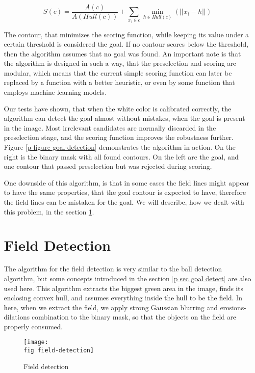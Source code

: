 \begin{equation*}
  S(c)=\frac{A(c)}{A(Hull(c))}+\displaystyle\sum_{x_i \in c}\min_{h \in Hull(c)
  }(||x_i-h||)
\end{equation*}

The contour, that minimizes the scoring function, while keeping its value under
a certain threshold is considered the goal. If no contour scores below the
threshold, then the algorithm assumes that no goal was found. An important note
is that the algorithm is designed in such a way, that the preselection and
scoring are modular, which means that the current simple scoring function can
later be replaced by a function with a better heuristic, or even by some
function that employs machine learning models.

Our tests have shown, that when the white color is calibrated correctly, the
algorithm can detect the goal almost without mistakes, when the goal is present
in the image. Most irrelevant candidates are normally discarded in the
preselection stage, and the scoring function improves the robustness further.
Figure \ref{p figure goal-detection} demonstrates the algorithm in action. On
the right is the binary mask with all found contours. On the left are the goal,
and one contour that passed preselection but was rejected during scoring.

One downside of this algorithm, is that in some cases the field lines
might appear to have the same properties, that the goal contour is expected to
have, therefore the field lines can be mistaken for the goal. We will describe,
how we dealt with this problem, in the section \ref{p sec field detect}.

\section{Field Detection}
\label{p sec field detect}

The algorithm for the field detection is very similar to the ball detection
algorithm, but some concepts introduced in the section \ref{p sec goal detect}
are also used here. This algorithm extracts the biggest green area in the
image, finds its enclosing convex hull, and assumes everything inside the hull
to be the field. In here, when we extract the field, we apply strong Gaussian
blurring and erosions-dilations combination to the binary mask, so that the
objects on the field are properly consumed.

\begin{figure}[ht]
  \texttt{[image: \\fig field-detection]}
  \caption{Field detection}
  \label{p figure field-detection}
\end{figure}

